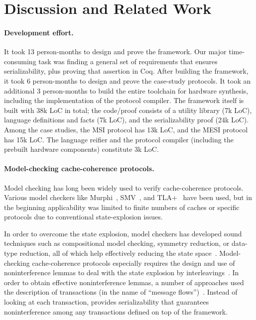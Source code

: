 \documentclass[sigplan,10pt,review,anonymous,screen]{acmart}\settopmatter{printfolios=true,printccs=false,printacmref=false}
\begin{document}
\section{Discussion and Related Work}
\label{sec-discussion}

\paragraph{Development effort.}
It took 13 person-months to design and prove the framework.
Our major time-consuming task was finding a general set of requirements that ensures serializability, plus proving that assertion in Coq.
After building the framework, it took 6 person-months to design and prove the case-study protocols.
It took an additional 3 person-months to build the entire toolchain for hardware synthesis, including the implementation of the protocol compiler.
The framework itself is built with 38k LoC in total; the code/proof consists of a utility library (7k LoC), language definitions and facts (7k LoC), and the serializability proof (24k LoC).
Among the case studies, the MSI protocol has 13k LoC, and the MESI protocol has 15k LoC.
The \hemiola{} language reifier and the protocol compiler (including the prebuilt hardware components) constitute 3k LoC.

\paragraph{Model-checking cache-coherence protocols.}

Model checking has long been widely used to verify cache-coherence protocols.
Various model checkers like Murphi~\cite{murphi:Dill:1996}, SMV~\cite{smv:McMillan:1993}, and TLA+~\cite{tla:Lamport:2002, Joshi:2003} have been used, but in the beginning applicability was limited to finite numbers of caches or specific protocols due to conventional state-explosion issues.

In order to overcome the state explosion, model checkers has developed sound techniques such as compositional model checking, symmetry reduction, or data-type reduction, all of which help effectively reducing the state space~\cite{McMillan:1999}.
Model-checking cache-coherence protocols especially requires the design and use of noninterference lemmas to deal with the state explosion by interleavings~\cite{McMillan:1999,McMillan:2001,Chou:2004}.
In order to obtain effective noninterference lemmas, a number of approaches used the description of transactions (in the name of ``message flows'')~\cite{flow:Talupur:2008,flow:OLeary:2009,flow:Sethi:2014}.
Instead of looking at each transaction, \hemiola{} provides serializability that guarantees noninterference among any transactions defined on top of the framework.
\end{document}
